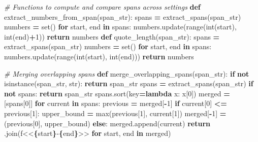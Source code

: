 \documentclass[
]{article}
\newenvironment{Shaded}{\begin{snugshade}}{\end{snugshade}}
\newcommand{\BuiltInTok}[1]{#1}
\newcommand{\CommentTok}[1]{\textcolor[rgb]{0.56,0.35,0.01}{\textit{#1}}}
\newcommand{\ControlFlowTok}[1]{\textcolor[rgb]{0.13,0.29,0.53}{\textbf{#1}}}
\newcommand{\DecValTok}[1]{\textcolor[rgb]{0.00,0.00,0.81}{#1}}
\newcommand{\KeywordTok}[1]{\textcolor[rgb]{0.13,0.29,0.53}{\textbf{#1}}}
\newcommand{\NormalTok}[1]{#1}
\newcommand{\OperatorTok}[1]{\textcolor[rgb]{0.81,0.36,0.00}{\textbf{#1}}}
\newcommand{\SpecialCharTok}[1]{\textcolor[rgb]{0.81,0.36,0.00}{\textbf{#1}}}
\newcommand{\SpecialStringTok}[1]{\textcolor[rgb]{0.31,0.60,0.02}{#1}}
\newcommand{\StringTok}[1]{\textcolor[rgb]{0.31,0.60,0.02}{#1}}
\begin{document}
\begin{Shaded}
\begin{Highlighting}[]
\CommentTok{\# Functions to compute and compare spans across settings}
\KeywordTok{def}\NormalTok{ extract\_numbers\_from\_span(span\_str):}
\NormalTok{    spans }\OperatorTok{=}\NormalTok{ extract\_spans(span\_str)}
\NormalTok{    numbers }\OperatorTok{=} \BuiltInTok{set}\NormalTok{()}
    \ControlFlowTok{for}\NormalTok{ start, end }\KeywordTok{in}\NormalTok{ spans:}
\NormalTok{        numbers.update(}\BuiltInTok{range}\NormalTok{(}\BuiltInTok{int}\NormalTok{(start), }\BuiltInTok{int}\NormalTok{(end)}\OperatorTok{+}\DecValTok{1}\NormalTok{))}
    \ControlFlowTok{return}\NormalTok{ numbers}
\KeywordTok{def}\NormalTok{ quote\_length(span\_str):}
\NormalTok{  spans }\OperatorTok{=}\NormalTok{ extract\_spans(span\_str)}
\NormalTok{  numbers }\OperatorTok{=} \BuiltInTok{set}\NormalTok{()}
  \ControlFlowTok{for}\NormalTok{ start, end }\KeywordTok{in}\NormalTok{ spans:}
\NormalTok{    numbers.update(}\BuiltInTok{range}\NormalTok{(}\BuiltInTok{int}\NormalTok{(start), }\BuiltInTok{int}\NormalTok{(end)))}
  \ControlFlowTok{return}\NormalTok{ numbers}

\CommentTok{\# Merging overlapping spans}
\KeywordTok{def}\NormalTok{ merge\_overlapping\_spans(span\_str):}
    \ControlFlowTok{if} \KeywordTok{not} \BuiltInTok{isinstance}\NormalTok{(span\_str, }\BuiltInTok{str}\NormalTok{):}
        \ControlFlowTok{return}\NormalTok{ span\_str}
\NormalTok{    spans }\OperatorTok{=}\NormalTok{ extract\_spans(span\_str)}
    \ControlFlowTok{if} \KeywordTok{not}\NormalTok{ spans:}
        \ControlFlowTok{return}\NormalTok{ span\_str}
\NormalTok{    spans.sort(key}\OperatorTok{=}\KeywordTok{lambda}\NormalTok{ x: x[}\DecValTok{0}\NormalTok{])}
\NormalTok{    merged }\OperatorTok{=}\NormalTok{ [spans[}\DecValTok{0}\NormalTok{]]}
    \ControlFlowTok{for}\NormalTok{ current }\KeywordTok{in}\NormalTok{ spans:}
\NormalTok{        previous }\OperatorTok{=}\NormalTok{ merged[}\OperatorTok{{-}}\DecValTok{1}\NormalTok{]}
        \ControlFlowTok{if}\NormalTok{ current[}\DecValTok{0}\NormalTok{] }\OperatorTok{\textless{}=}\NormalTok{ previous[}\DecValTok{1}\NormalTok{]:}
\NormalTok{            upper\_bound }\OperatorTok{=} \BuiltInTok{max}\NormalTok{(previous[}\DecValTok{1}\NormalTok{], current[}\DecValTok{1}\NormalTok{])}
\NormalTok{            merged[}\OperatorTok{{-}}\DecValTok{1}\NormalTok{] }\OperatorTok{=}\NormalTok{ (previous[}\DecValTok{0}\NormalTok{], upper\_bound)}
        \ControlFlowTok{else}\NormalTok{:}
\NormalTok{            merged.append(current)}
    \ControlFlowTok{return} \StringTok{\textquotesingle{} \textquotesingle{}}\NormalTok{.join(}\SpecialStringTok{f\textquotesingle{}\textless{}\textless{}}\SpecialCharTok{\{}\NormalTok{start}\SpecialCharTok{\}}\SpecialStringTok{{-}}\SpecialCharTok{\{}\NormalTok{end}\SpecialCharTok{\}}\SpecialStringTok{\textgreater{}\textgreater{}\textquotesingle{}} \ControlFlowTok{for}\NormalTok{ start, end }\KeywordTok{in}\NormalTok{ merged)}



\end{Highlighting}
\end{Shaded}
\end{document}
